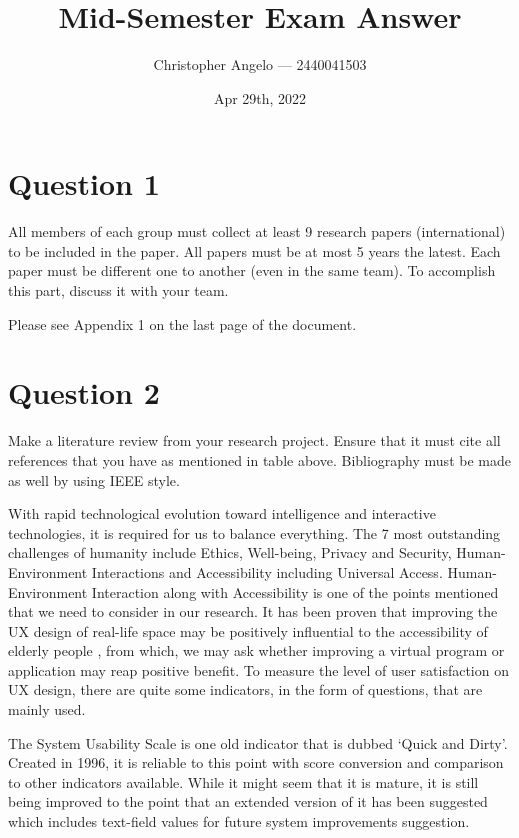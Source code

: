 \documentclass[
  11pt, %
]{assignment}
\author{Christopher Angelo --- 2440041503}
\institute{BINUS University\\ Global Class}
\date{Apr 29th, 2022}
\title{Mid-Semester Exam Answer}
\begin{document}
\maketitle


\section*{Question 1}
\begin{problem}
All members of each group must collect at least 9 research papers (international) to be included in the paper. All papers must be at most 5 years the latest. Each paper must be different one to another (even in the same team). To accomplish this part, discuss it with your team.
\end{problem}

Please see Appendix 1 on the last page of the document.

\section*{Question 2}
\begin{problem}
Make a literature review from your research project. Ensure that it must cite all references that you have as mentioned in table above. Bibliography must be made as well by using IEEE style.
\end{problem}

With rapid technological evolution toward intelligence and interactive technologies, it is required for us to balance everything. The 7 most outstanding challenges of humanity include Ethics, Well-being, Privacy and Security, Human-Environment Interactions and Accessibility including Universal Access\autocite{Stephanidis2019SevenHG}. Human-Environment Interaction along with Accessibility is one of the points mentioned that we need to consider in our research. It has been proven that improving the UX design of real-life space may be positively influential to the accessibility of elderly people \autocite{Yoo2021TheEO}, from which, we may ask whether improving a virtual program or application may reap positive benefit. To measure the level of user satisfaction on UX design, there are quite some indicators, in the form of questions, that are mainly used.

The System Usability Scale is one old indicator that is dubbed `Quick and Dirty'. Created in 1996, it is reliable to this point with score conversion and comparison to other indicators available\autocite{Lewis2018MeasuringPU, Lewis2018ItemBF}. While it might seem that it is mature, it is still being improved to the point that an extended version of it has been suggested which includes text-field values for future system improvements suggestion\autocite{Harper2021APS}.
\end{document}
